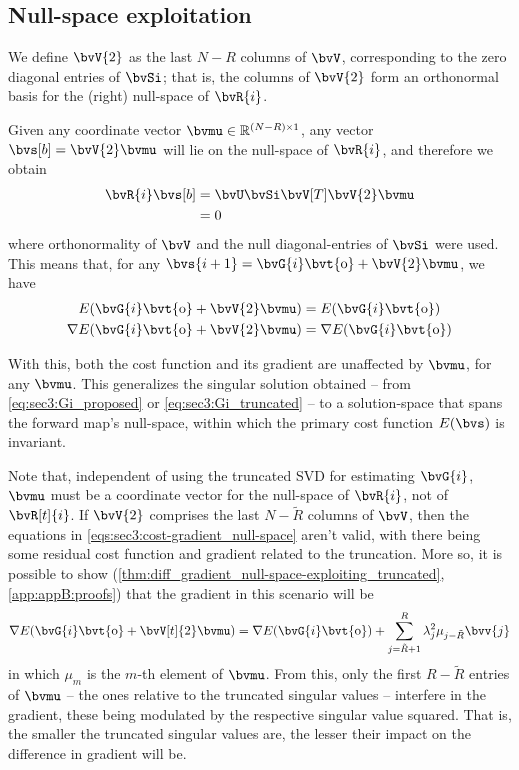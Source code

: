 \subsection{Null-space exploitation}

We define $\bvV{2}$ as the last $N-R$ columns of $\bvV$, corresponding to the zero diagonal entries of $\bvSi$; that is, the columns of $\bvV{2}$ form an orthonormal basis for the (right) null-space of $\bvR{i}$.

Given any coordinate vector $\bvmu \in \re^{\sz{(N-R)}{1}}$, any vector $\bvs[b] = \bvV{2} \bvmu$ will lie on the null-space of $\bvR{i}$, and therefore we obtain
\begin{equation}
	\begin{split}
		\bvR{i} \bvs[b] 
		& = \bvU \bvSi \bvV[T] \bvV{2} \bvmu \\
		& = 0
	\end{split}
\end{equation}
where orthonormality of $\bvV$ and the null diagonal-entries of $\bvSi$ were used. This means that, for any $\bvs{i+1} = \bvG{i} \bvt{\obs} + \bvV{2} \bvmu$, we have
\begin{subequations}
	\label{eqs:sec3:cost-gradient_null-space}
	\begin{gather}
		E(\bvG{i} \bvt{\obs} + \bvV{2} \bvmu) = E(\bvG{i} \bvt{\obs})\\
		\nabla E(\bvG{i} \bvt{\obs} + \bvV{2} \bvmu) = \nabla E(\bvG{i} \bvt{\obs})
	\end{gather}
\end{subequations}

With this, both the cost function and its gradient are unaffected by $\bvmu$, for any $\bvmu$. This generalizes the singular solution obtained -- from \cref{eq:sec3:Gi_proposed} or \cref{eq:sec3:Gi_truncated} -- to a solution-space that spans the forward map's null-space, within which the primary cost function $E(\bvs)$ is invariant.

Note that, independent of using the truncated SVD for estimating $\bvG{i}$, $\bvmu$ must be a coordinate vector for the null-space of $\bvR{i}$, not of $\bvR[t]{i}$. If $\bvV{2}$ comprises the last $N-\tilde{R}$ columns of $\bvV$, then the equations in \cref{eqs:sec3:cost-gradient_null-space} aren't valid, with there being some residual cost function and gradient related to the truncation. More so, it is possible to show (\cref{thm:diff_gradient_null-space-exploiting_truncated}, \cref{app:appB:proofs}) that the gradient in this scenario will be
\begin{equation}
	\nabla E( \bvG{i} \bvt{\obs} + \bvV[t]{2} \bvmu) = \nabla E(\bvG{i} \bvt{\obs}) + \sum_{j=\tilde{R}+1}^{R} \lambda_j^2 \mu_{j-\tilde{R}} \bvv{j}
\end{equation}
in which $\mu_{m}$ is the $m$-th element of $\bvmu$. From this, only the first $R-\tilde{R}$ entries of $\bvmu$ -- the ones relative to the truncated singular values -- interfere in the gradient, these being modulated by the respective singular value squared. That is, the smaller the truncated singular values are, the lesser their impact on the difference in gradient will be.

